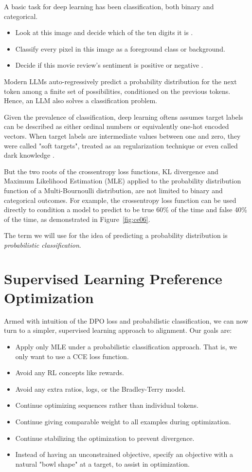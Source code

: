 \documentclass[twoside,11pt]{article}
\begin{document}
A basic task for deep learning has been classification, both
binary and categorical. 
\begin{itemize}
\item Look at this image and decide which of the ten digits it is 
  \citep{lecun1998mnist}.
\item Classify every pixel in this image as a foreground class or background. 
\item Decide if this movie review's sentiment is positive or
negative \citep{Pang+Lee:04a}.
\end{itemize}

Modern LLMs auto-regressively predict a probability distribution for 
the next token among a finite set of possibilities, conditioned on the 
previous tokens. Hence, an LLM also solves 
a classification problem. 

Given the prevalence of classification, deep learning oftens assumes
target labels can be described as either ordinal numbers
or equivalently one-hot encoded vectors. When target labels are
intermediate values between one and zero, they were called "soft targets", 
treated as an regularization technique or even called dark knowledge
\citep{hinton2015distilling, szegedy2016rethinking,hinton2014dark}. 

But the two roots of the crossentropy
loss functions, KL divergence and Maximum Likelihood Estimation (MLE) applied
to the probability distribution function of a Multi-Bournoulli
distribution, are not limited to binary and categorical outcomes. 
For example, the crossentropy loss function can be used directly 
to condition a model to predict to be true 60\% of the time and false 40\% of 
the time, as demonstrated in Figure~\ref{fig:ce06}. 

The term we will use for the idea of
predicting a probability distribution is \emph{probabilistic classification}.

\section{Supervised Learning Preference Optimization}

Armed with intuition of the DPO loss and probabilistic classification, we can
now turn to a simpler, supervised learning approach to alignment. Our
goals are:
\begin{itemize}
\item Apply only MLE under a probabilistic classification approach. 
  That is, we only want to use a CCE loss function. 
\item Avoid any RL concepts like rewards.
\item Avoid any extra ratios, logs, or the Bradley-Terry model.
\item Continue optimizing sequences rather than individual tokens.
\item Continue giving comparable weight to all examples during optimization.
\item Continue stabilizing the optimization to prevent divergence.  
\item Instead of having an unconstrained objective, 
  specify an objective with a natural "bowl shape" at a target, to assist
  in optimization.
\end{itemize} 
\end{document}
